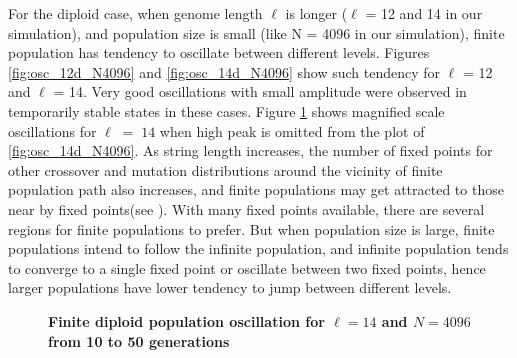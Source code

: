 For the diploid case, when genome length $\ell$ is longer ($\ell$ = 12 and 14 in our simulation), 
and population size is small (like N = 4096 in our simulation), finite population has tendency to 
oscillate between different levels. Figures \ref{fig:osc_12d_N4096} and \ref{fig:osc_14d_N4096} show such tendency for 
$\ell$ = 12 and $\ell$ = 14. Very good oscillations with small amplitude were observed in temporarily stable states 
in these cases. Figure \ref{oscillation_14d_N4096} shows magnified scale oscillations for $\ell \;=\; 14$ 
when high peak is omitted from the plot of \ref{fig:osc_14d_N4096}. 
As string length increases, the number of fixed points for other crossover and mutation distributions 
around the vicinity of finite population path also increases, 
and finite populations may get attracted to those near by fixed points(see \cite{Vose1999}). 
With many fixed points available, 
there are several regions for finite populations to prefer. 
But when population size is large, finite populations intend to follow the infinite population, 
and infinite population tends to 
converge to a single fixed point or oscillate between two fixed points, hence  
larger populations have lower tendency to jump between different levels.

\begin{figure}[h]
\begin{center}
 \hspace{-3em}%
\caption{\textbf{Finite diploid population oscillation for $\ell = 14$ and $N = 4096$ from 10 to 50 generations}}
\label{oscillation_14d_N4096}
\end{center}
\end{figure}

